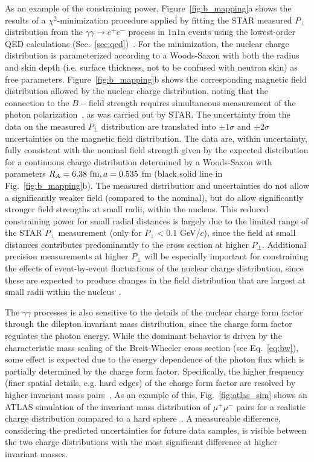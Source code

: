 \documentclass[twocolumn,epjc3]{svjour3}\sloppy
\begin{document}
As an example of the constraining power, Figure~\ref{fig:b_mapping}a shows the results of a $\chi^2$-minimization procedure applied by fitting the STAR measured $P_\perp$ distribution from the $\gamma\gamma \rightarrow e^+e^-$ process in $1$n$1$n events using the lowest-order QED calculations (Sec.~\ref{sec:qed})~\cite{starcollaborationMeasurementMomentumAngular2021}. For the minimization, the nuclear charge distribution is parameterized according to a Woods-Saxon with both the radius and skin depth (i.e. surface thickness, not to be confused with neutron skin) as free parameters. 
Figure~\ref{fig:b_mapping}b shows the corresponding magnetic field distribution allowed by the nuclear charge distribution, noting that the connection to the $B-$field strength requires simultaneous measurement of the photon polarization~\cite{starcollaborationMeasurementMomentumAngular2021}, as was carried out by STAR. 
The uncertainty from the data on the measured $P_\perp$ distribution are translated into $\pm1\sigma$ and $\pm2\sigma$ uncertainties on the magnetic field distribution. 
The data are, within uncertainty, fully consistent with the nominal field strength given by the expected distribution for a continuous charge distribution determined by a Woods-Saxon with parameters $R_A=6.38\ {\rm fm}, a=0.535$ fm (black solid line in Fig.~\ref{fig:b_mapping}b). 
The measured distribution and uncertainties do not allow a significantly weaker field (compared to the nominal), but do allow significantly stronger field strengths at small radii, within the nucleus. 
This reduced constraining power for small radial distances is largely due to the limited range of the STAR $P_\perp$ measurement (only for $P_\perp < 0.1$ GeV/$c$), since the field at small distances contributes predominantly to the cross section at higher $P_\perp$.
Additional precision measurements at higher $P_\perp$ will be especially important for constraining the effects of event-by-event fluctuations of the nuclear charge distribution, since these are expected to produce changes in the field distribution that are largest at small radii within the nucleus~\cite{skokovEstimateMagneticField2009}. 


The $\gamma\gamma$ processes is also sensitive to the details of the nuclear charge form factor through the dilepton invariant mass distribution, since the charge form factor regulates the photon energy. While the dominant behavior is driven by the characteristic mass scaling of the Breit-Wheeler cross section (see Eq.~\ref{eq:bw}), some effect is expected due to the energy dependence of the photon flux which is partially determined by the charge form factor. Specifically, the higher frequency (finer spatial details, e.g. hard edges) of the charge form factor are resolved by higher invariant mass pairs~\cite{klusek-gawendaExclusiveMuonpairProduction2010}. 
As an example of this, Fig.~\ref{fig:atlas_sim} shows an ATLAS simulation of the invariant mass distribution of $\mu^+\mu^-$ pairs for a realistic charge distribution compared to a hard sphere~\cite{ProspectsMeasurementsPhotonInduced}. A measureable difference, considering the predicted uncertainties for future data samples, is visible between the two charge distributions with the most significant difference at higher invariant masses.
\end{document}
